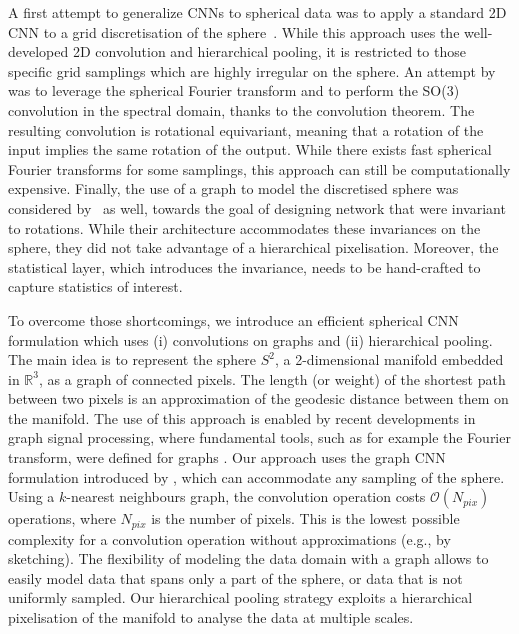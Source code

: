 \documentclass[final,twocolumn,3p,times,authoryear]{elsarticle}
\newcommand{\todo}[1]{{\color[rgb]{.6,.1,.6}{#1}}}
\newcommand{\1}{\b{1}}              %
\newcommand{\0}{\b{0}}              %
\begin{document}
A first attempt to generalize CNNs to spherical data was to apply a standard 2D CNN to a grid discretisation of the sphere~\citep{boomsma2017spherical}. While this approach uses the well-developed 2D convolution and hierarchical pooling, it is restricted to those specific grid samplings which are highly irregular on the sphere.
An attempt by~\citet{cohen2018sphericalcnn} was to leverage the spherical Fourier transform and to perform the SO(3) convolution in the spectral domain, thanks to the convolution theorem.
The resulting convolution is rotational equivariant, meaning that a rotation of the input implies the same rotation of the output.
While there exists fast spherical Fourier transforms for some samplings, this approach can still be computationally expensive.
Finally, the use of a graph to model the discretised sphere was considered by~\citet{khasanova2017graphomni} as well, towards the goal of designing network that were invariant to rotations.
While their architecture accommodates these invariances on the sphere, they did not take advantage of a hierarchical pixelisation.
Moreover, the statistical layer, which introduces the invariance, needs to be hand-crafted to capture statistics of interest.
\todo{better identify the shortcomings: (i) part of sphere / missing data, (ii) computational efficiency, (iii) equivarience}

To overcome those shortcomings, we introduce an efficient spherical CNN formulation which uses (i) convolutions on graphs and (ii) hierarchical pooling.
The main idea is to represent the sphere $S^2$, a 2-dimensional manifold embedded in $\mathbb{R}^3$, as a graph of connected pixels.
The length (or weight) of the shortest path between two pixels is an approximation of the geodesic distance between them on the manifold.
The use of this approach is enabled by recent developments in graph signal processing, where fundamental tools, such as for example the Fourier transform, were defined for graphs \citep{shuman2013emerging}.
Our approach uses the graph CNN formulation introduced by \citet{defferrard2016convolutional}, which can accommodate any sampling of the sphere.
Using a $k$-nearest neighbours graph, the convolution operation costs $\mathcal{O}(N_{pix})$ operations, where $N_{pix}$ is the number of pixels.
This is the lowest possible complexity for a convolution operation without approximations (e.g., by sketching).
The flexibility of modeling the data domain with a graph allows to easily model data that spans only a part of the sphere, or data that is not uniformly sampled.
Our hierarchical pooling strategy exploits a hierarchical pixelisation of the manifold to analyse the data at multiple scales.
\end{document}
